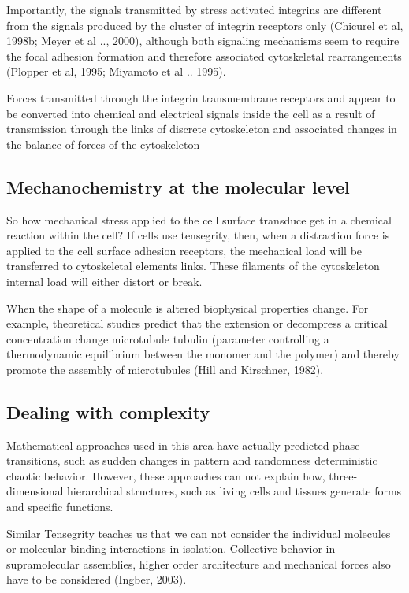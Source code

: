     Importantly, the signals transmitted by stress activated integrins are different from the signals produced by the cluster of integrin receptors only (Chicurel et al, 1998b; Meyer et al .., 2000), although both signaling mechanisms seem to require the focal adhesion formation and therefore associated cytoskeletal rearrangements (Plopper et al, 1995; Miyamoto et al .. 1995).

    Forces transmitted through the integrin transmembrane receptors and appear to be converted into chemical and electrical signals inside the cell as a result of transmission through the links of discrete cytoskeleton and associated changes in the balance of forces of the cytoskeleton

\subsection{Mechanochemistry at the molecular level}

    So how mechanical stress applied to the cell surface transduce get in a chemical reaction within the cell? If cells use tensegrity, then, when a distraction force is applied to the cell surface adhesion receptors, the mechanical load will be transferred to cytoskeletal elements links. These filaments of the cytoskeleton internal load will either distort or break.

    When the shape of a molecule is altered biophysical properties change. For example, theoretical studies predict that the extension or decompress a critical concentration change microtubule tubulin (parameter controlling a thermodynamic equilibrium between the monomer and the polymer) and thereby promote the assembly of microtubules (Hill and Kirschner, 1982).

\subsection{Dealing with complexity}

    Mathematical approaches used in this area have actually predicted phase transitions, such as sudden changes in pattern and randomness deterministic chaotic behavior. However, these approaches can not explain how, three-dimensional hierarchical structures, such as living cells and tissues generate forms and specific functions.

    Similar Tensegrity teaches us that we can not consider the individual molecules or molecular binding interactions in isolation. Collective behavior in supramolecular assemblies, higher order architecture and mechanical forces also have to be considered (Ingber, 2003).

